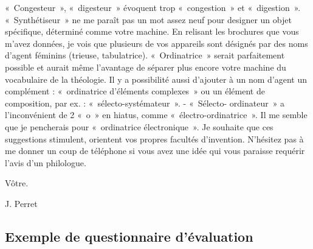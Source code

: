 {{
}
«~Congesteur~», «~digesteur~» évoquent trop «~congestion~» et «~digestion~».
«~Synthé\-ti\-seur~» ne me
paraît pas un mot assez neuf pour designer un objet spécifique, déterminé comme votre machine.
En relisant les brochures que vous m'avez données, je vois que plusieurs de vos appareils sont
désignés par des noms d'agent féminins (trieuse, tabulatrice). «~Ordinatrice~» serait parfaitement
possible et aurait même l'avantage de séparer plus encore votre machine du vocabulaire de la
théologie.
Il y a possibilité aussi d'ajouter à un nom d'agent un complément : «~ordinatrice d'éléments
complexes~» ou un élément de composition, par ex. : «~sélecto-sys\-té\-ma\-teur~». - «~Sélecto-
ordinateur~» a l'inconvénient de 2 «~o~» en hiatus, comme «~électro-ordinatrice~».
Il me semble que je pencherais pour «~ordinatrice électroni\-que~». Je souhaite que ces suggestions
stimulent, orientent vos propres facultés d'invention. N'hésitez pas à me donner un coup de
téléphone si vous avez une idée qui vous paraisse requérir l'avis d'un philologue.

Vôtre.

J. Perret
}


\subsection{Exemple de questionnaire d'évaluation}\label{annexe:eval}


